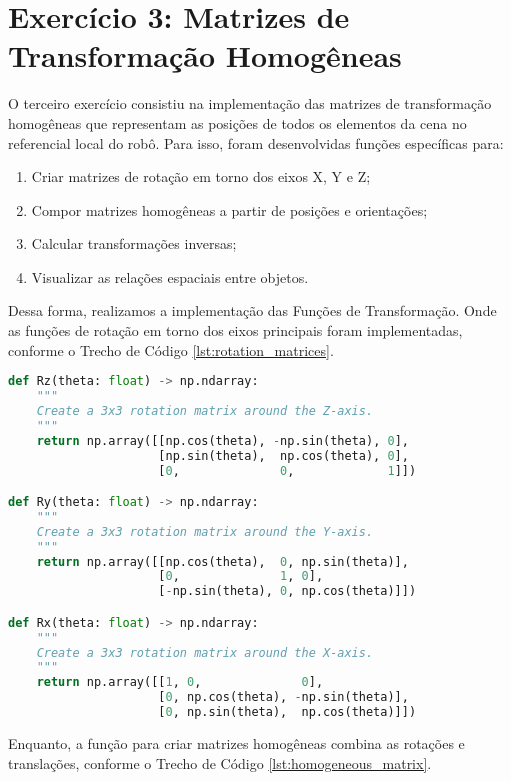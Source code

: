\section{Exercício 3: Matrizes de Transformação Homogêneas} \label{sec:ex3}

O terceiro exercício consistiu na implementação das matrizes de transformação homogêneas que representam as posições de todos os elementos da cena no referencial local do robô. Para isso, foram desenvolvidas funções específicas para:

\begin{enumerate}
    \item Criar matrizes de rotação em torno dos eixos X, Y e Z;
    \item Compor matrizes homogêneas a partir de posições e orientações;
    \item Calcular transformações inversas;
    \item Visualizar as relações espaciais entre objetos.
\end{enumerate}

Dessa forma, realizamos a implementação das Funções de Transformação. Onde as funções de rotação em torno dos eixos principais foram implementadas, conforme o Trecho de Código \ref{lst:rotation_matrices}.

\begin{lstlisting}[language=Python, caption=Funções para matrizes de rotação, label=lst:rotation_matrices]
def Rz(theta: float) -> np.ndarray:
    """
    Create a 3x3 rotation matrix around the Z-axis.
    """
    return np.array([[np.cos(theta), -np.sin(theta), 0],
                     [np.sin(theta),  np.cos(theta), 0],
                     [0,              0,             1]])

def Ry(theta: float) -> np.ndarray:
    """
    Create a 3x3 rotation matrix around the Y-axis.
    """
    return np.array([[np.cos(theta),  0, np.sin(theta)],
                     [0,              1, 0],
                     [-np.sin(theta), 0, np.cos(theta)]])

def Rx(theta: float) -> np.ndarray:
    """
    Create a 3x3 rotation matrix around the X-axis.
    """
    return np.array([[1, 0,              0],
                     [0, np.cos(theta), -np.sin(theta)],
                     [0, np.sin(theta),  np.cos(theta)]])
\end{lstlisting}

Enquanto, a função para criar matrizes homogêneas combina as rotações e translações,  conforme o Trecho de Código \ref{lst:homogeneous_matrix}.


